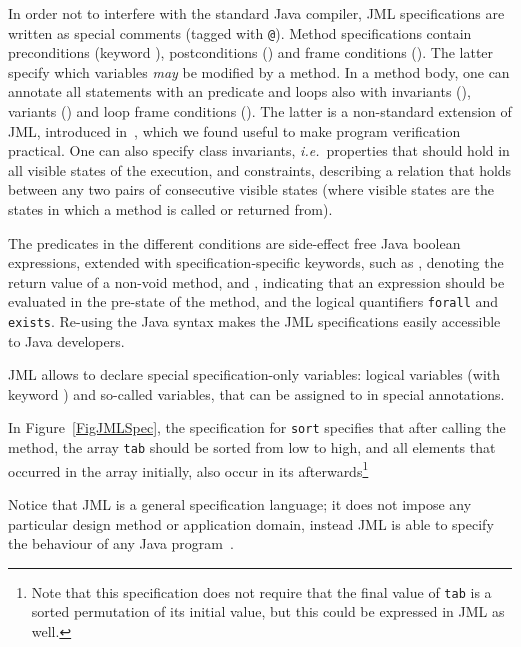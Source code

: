 In order not to interfere with the standard Java compiler, JML
specifications are written as special comments (tagged with
\texttt{@}). Method specifications contain preconditions (keyword
), postconditions () and frame
conditions (). The latter specify which variables
\emph{may} be modified by a method. In a method body, one can
annotate all statements with an  predicate and loops
also with invariants (), variants
() and loop frame conditions (). The latter is a non-standard extension of JML, introduced
in~\cite{BurdyRL03}, which we found useful to make program
verification practical. One can also specify class invariants,
\emph{i.e.}\ properties that should hold in all visible states of the
execution, and constraints, describing a relation that 
holds between any two pairs of consecutive visible states (where
visible states are the states in which a method is called or returned
from).

The predicates in the different conditions are side-effect free Java
boolean expressions, extended with specification-specific keywords,
such as , denoting the return value of a non-void
method, and , indicating that an expression should be
evaluated in the pre-state of the method, and the logical quantifiers
\texttt{\bsl forall} and \texttt{\bsl exists}. Re-using the Java syntax
makes the JML specifications easily accessible to Java developers.

JML allows to declare special specification-only variables: logical
variables (with keyword ) and so-called 
variables, that can be assigned to in special 
annotations.

In Figure~\ref{FigJMLSpec}, the specification for \texttt{sort}
specifies that after calling the method, the array \texttt{tab} should
be sorted from low to high, and all elements that occurred in the
array initially, also occur in its afterwards\footnote{Note that this
specification does not require that the final value of \texttt{tab} is
a sorted permutation of its initial value, but this could be expressed
in JML as well.}

Notice that JML is a general specification language; it does not
impose any particular design method or application domain, instead JML
is able to specify the behaviour of any Java
program~\cite{LeavensBR06}. 


